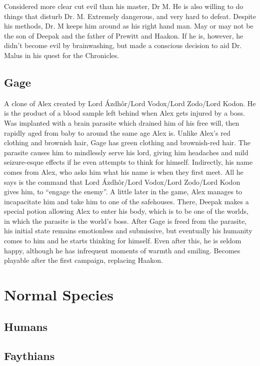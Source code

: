 \documentclass{gd-document}
\begin{document}
Considered more clear cut evil than his master, Dr M. He is also
willing to do things that disturb Dr. M. Extremely dangerous, and very
hard to defeat. Despite his methods, Dr. M keeps him around as his
right hand man. May or may not be the son of Deepak and the father of
Prewitt and Haakon. If he is, however, he didn't become evil by
brainwashing, but made a conscious decision to aid Dr. Malus in his
quest for the Chronicles.

\subsection{Gage}

A clone of Alex created by Lord Ázdhôr/Lord Vodox/Lord Zodo/Lord
Kodon. He is the product of a blood sample left behind when Alex gets
injured by a boss. Was implanted with a brain parasite which drained
him of his free will, then rapidly aged from baby to around the same
age Alex is. Unlike Alex's red clothing and brownish hair, Gage has
green clothing and brownish-red hair. The parasite causes him to
mindlessly serve his lord, giving him headaches and mild seizure-esque
effects if he even attempts to think for himself. Indirectly, his name
comes from Alex, who asks him what his name is when they first
meet. All he says is the command that Lord Ázdhôr/Lord Vodox/Lord
Zodo/Lord Kodon gives him, to “engage the enemy”. A little later in
the game, Alex manages to incapacitate him and take him to one of the
safehouses. There, Deepak makes a special potion allowing Alex to
enter his body, which is to be one of the worlds, in which the
parasite is the world's boss. After Gage is freed from the parasite,
his initial state remains emotionless and submissive, but eventually
his humanity comes to him and he starts thinking for himself. Even
after this, he is seldom happy, although he has infrequent moments of
warmth and smiling. Becomes playable after the first campaign,
replacing Haakon.

\section{Normal Species}

\subsection{Humans}

\subsection{Faythians}
\end{document}
